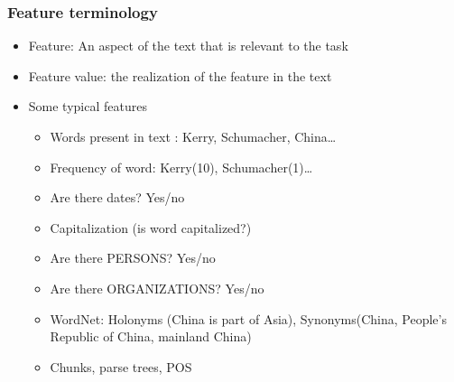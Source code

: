 \begin{frame}[fragile]
  \frametitle{Feature terminology}
\begin{itemize}
\item Feature: An aspect of the text  that is relevant to the task
\item Feature value: the realization of the feature in the text
\item Some typical features
\begin{itemize}
\item Words present in text : Kerry, Schumacher, China\ldots 
\item Frequency of word: Kerry(10), Schumacher(1)\ldots
\item Are there dates? Yes/no
\item Capitalization (is word capitalized?)
\item Are there PERSONS? Yes/no
\item Are there ORGANIZATIONS? Yes/no
\item WordNet: Holonyms (China is part of Asia), Synonyms(China, People's Republic of China, mainland China)
\item Chunks, parse trees, POS
\end{itemize}
\end{itemize}
\end{frame}

